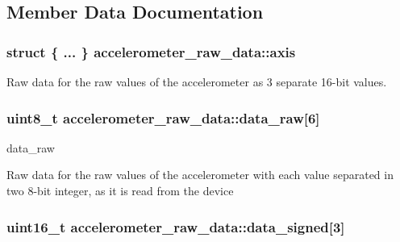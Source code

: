 \subsection{Member Data Documentation}
\subsubsection[{\texorpdfstring{axis}{axis}}]{\setlength{\rightskip}{0pt plus 5cm}struct \{ ... \}   accelerometer\+\_\+raw\+\_\+data\+::axis}\hypertarget{unionaccelerometer__raw__data_a308f41f8f6fe55c187825216937cc729}{}\label{unionaccelerometer__raw__data_a308f41f8f6fe55c187825216937cc729}


Raw data for the raw values of the accelerometer as 3 separate 16-\/bit values. 

\subsubsection[{\texorpdfstring{data\+\_\+raw}{data_raw}}]{\setlength{\rightskip}{0pt plus 5cm}uint8\+\_\+t accelerometer\+\_\+raw\+\_\+data\+::data\+\_\+raw\mbox{[}6\mbox{]}}\hypertarget{unionaccelerometer__raw__data_ad5506633cb7fb456ed9fccdf2cbe6e5b}{}\label{unionaccelerometer__raw__data_ad5506633cb7fb456ed9fccdf2cbe6e5b}


data\+\_\+raw 

Raw data for the raw values of the accelerometer with each value separated in two 8-\/bit integer, as it is read from the device 
\subsubsection[{\texorpdfstring{data\+\_\+signed}{data_signed}}]{\setlength{\rightskip}{0pt plus 5cm}uint16\+\_\+t accelerometer\+\_\+raw\+\_\+data\+::data\+\_\+signed\mbox{[}3\mbox{]}}\hypertarget{unionaccelerometer__raw__data_a0e8bfd8a99a6c123b9a3f4e766dc98e3}{}\label{unionaccelerometer__raw__data_a0e8bfd8a99a6c123b9a3f4e766dc98e3}


